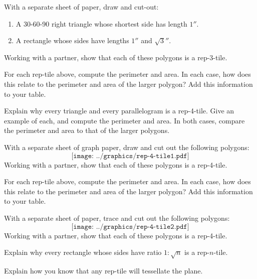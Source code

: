 \begin{prob}
With a separate sheet of paper, draw and cut-out:
\begin{enumerate}
\item A 30-60-90 right triangle whose shortest side has length $1''$.
\item A rectangle whose sides have lengths $1''$ and $\sqrt{3}''$.
\end{enumerate}
Working with a partner, show that each of these polygons is a rep-3-tile.
\end{prob}

\begin{prob}
For each rep-tile above, compute the perimeter and area. In each case,
how does this relate to the perimeter and area of the larger polygon?
Add this information to your table.
\end{prob}


\begin{prob}
Explain why every triangle and every parallelogram is a
rep-4-tile. Give an example of each, and compute the perimeter and
area. In both cases, compare the perimeter and area to that of the
larger polygons.
\end{prob}



\begin{prob}
With a separate sheet of graph paper, draw and cut out the following polygons:
\[
\texttt{[image: ../graphics/rep-4-tile1.pdf]}
\]
Working with a partner, show that each of these polygons is a rep-4-tile.
\end{prob}

\begin{prob}
For each rep-tile above, compute the perimeter and area. In each case,
how does this relate to the perimeter and area of the larger polygon?
Add this information to your table.
\end{prob}


\begin{prob}
With a separate sheet of paper, trace and cut out the following
polygons:
\[
\texttt{[image: ../graphics/rep-4-tile2.pdf]}
\]
Working with a partner, show that each of these polygons is a rep-4-tile.
\end{prob}


\begin{prob}
Explain why every rectangle whose sides have ratio $1:\sqrt{n}$ is a
rep-$n$-tile.
\end{prob}

\begin{prob}
Explain how you know that any rep-tile will tessellate the plane.
\end{prob}


